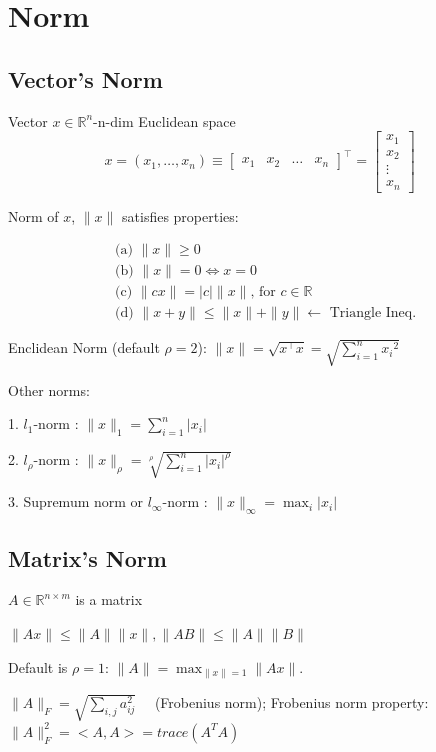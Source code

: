 \documentclass[11pt]{elegantbook}
\begin{document}
\section{Norm}
\subsection{Vector's Norm}
Vector $x \in \mathbb{R}^{n}$-n-dim Euclidean space
$$
x=\left(x_{1}, \ldots, x_{n}\right) \equiv\left[\begin{array}{llll}
x_{1} & x_{2} & \ldots & x_{n}
\end{array}\right]^{\top}=\left[\begin{array}{c}
x_{1} \\
x_{2} \\
\vdots \\
x_{n}
\end{array}\right]
$$

Norm of $x$, $\|x\|$ satisfies properties:

$$
\begin{aligned}
&\text { (a) }\|x\| \geqslant 0 \\
&\text { (b) }\|x\|=0 \Leftrightarrow x=0 \\
&\text { (c) }\|c x\|=|c|\|x\| \text {, for } c \in \mathbb{R} \\
&\text { (d) }\|x+y\| \leqslant\|x\|+\|y\| \longleftarrow \text { Triangle Ineq. }
\end{aligned}
$$

Enclidean Norm (default $\rho=2$): $\|x\|=\sqrt{x^{\top} x}=\sqrt{\sum_{i=1}^{n} x_{i}{ }^{2}}$

Other norms:

1. $l_{1}$-norm : $\|x\|_{1}=\sum_{i=1}^{n}\left|x_{i}\right|$

2. $l_{\rho}$-norm : $\|x\|_{\rho}=\sqrt[\rho]{\sum_{i=1}^{n}\left|x_{i}\right|^\rho}$

3. Supremum norm or $l_{\infty}$-norm : $\|x\|_{\infty}=\max _{i}\left|x_{i}\right|$

\subsection{Matrix's Norm}
$A\in \mathbb{R}^{n\times m}$ is a matrix

$\|A x\| \leqslant\|A\|\|x\|,\|A B\| \leqslant\|A\|\|B\|$

Default is $\rho=1$: $\|A\|=\max _{\|x\|=1}\|A x\|$.

$\|A\|_{F}=\sqrt{\sum_{i, j} a_{i j}^{2}} \quad$ (Frobenius norm);  Frobenius norm property: $\|A\|_F^2=<A,A>=trace(A^TA)$
\end{document}
